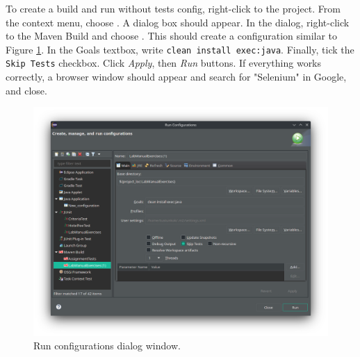 To create a build and run without tests config, right-click to the project. From the context menu, choose . A dialog box should appear. In the dialog, right-click to the Maven Build and choose . This should create a configuration similar to Figure \ref{fig:run-configs}. In the Goals textbox, write \lstinline[language={}]!clean install exec:java!. Finally, tick the \lstinline[language={}]!Skip Tests! checkbox. Click \emph{Apply}, then \emph{Run} buttons. If everything works correctly, a browser window should appear and search for "Selenium" in Google, and close.

\begin{figure}[H]
    \centering
    \includegraphics[width=\textwidth]{images/maven-run-config.png}
    \caption{Run configurations dialog window.}
    \label{fig:run-configs}
\end{figure}